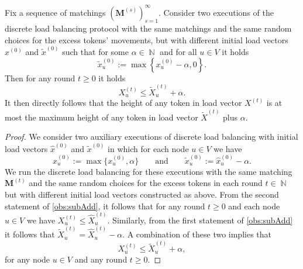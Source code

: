 \documentclass[twoside,leqno]{article}
\DeclareMathOperator{\N}{\mathbb{N}}
\newcommand{\M}{\mathbf{M}}
\DeclareMathOperator{\1}{\mathbf{1}}
\numberwithin{equation}{section}
\begin{document}
\begin{observation}\label{obs:subAddAppl}
Fix a sequence of matchings $\left(\M^{(s)}\right)_{s=1}^{\infty}$.
Consider two executions of the discrete load balancing protocol with the same matchings and the same random choices for the excess tokens' movements, but with different initial load vectors $x^{(0)}$ and $\widetilde{x}^{(0)}$ such that for some $\alpha\in \N$ and for all $u\in V$ it holds
\[
\widetilde{x}_u^{(0)} := \max\left\{ x_u^{(0)}-\alpha,0 \right\}.
\]
Then for any round $t\ge 0$ it holds
\[
X_u^{(t)} \le \widetilde{X}_u^{(t)} + \alpha.
\]
It then directly follows that the height of any token in load vector $X^{(t)}$ is at most the maximum height of any token in load vector $\widetilde{X}^{(t)}$ plus $\alpha$.
\end{observation}
\begin{proof}
We consider two auxiliary executions of discrete load balancing with initial load vectors $\widehat{x}^{(0)}$ and $\widetilde{x}^{(0)}$ in which for each node $u\in V$ we have
\[\widehat{x}^{(0)}_u:= \max\{x_u^{(0)},\alpha\} \quad\quad \text{and} \quad\quad \widetilde{x}^{(0)}_u:= \widehat{x}^{(0)}_u - \alpha.\]
We run the discrete load balancing for these executions with the same matching $\M^{(t)}$ and the same random choices for the excess tokens in each round $t\in \N$ but with different initial load vectors constructed as above.
From the second statement of \cref{obs:subAdd}, it follows that for any round $t\ge 0$ and each node $u\in V$ we have $X_u^{(t)} \le \widehat{X}_u^{(t)}$. Similarly, from the first statement of \cref{obs:subAdd} it follows that
$\widetilde{X}_u^{(t)} = \widehat{X}_u^{(t)}-\alpha$. A combination of these two implies that
\begin{equation*}\label{eq:diffExecutions}
X_u^{(t)} \le \widetilde{X}_u^{(t)} + \alpha,
\end{equation*}
for any node $u\in V$ and any round $t\ge 0$.
\end{proof}
\end{document}
